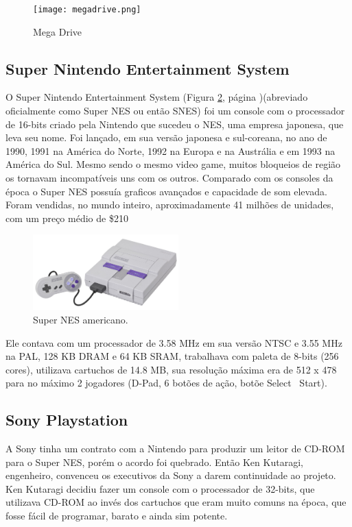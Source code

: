 \documentclass[12pt]{article}
\begin{document}
\begin{figure}[!htb]
    \centering
    \texttt{[image: megadrive.png]}
    \caption{Mega Drive}
    \label{fig:mega}
\end{figure} 



 \subsection{Super Nintendo Entertainment System}
 O Super Nintendo Entertainment System (Figura \ref{fig:snes}, página \pageref{fig:snes})(abreviado oficialmente como Super NES ou ent\~{a}o SNES) foi um console com o processador de 16-bits criado pela Nintendo que sucedeu o NES, uma empresa japonesa, que leva seu nome. Foi lançado, em sua vers\~{a}o japonesa e sul-coreana, no ano de 1990, 1991 na América do Norte, 1992 na Europa e na Austrália e em 1993 na América do Sul. Mesmo sendo o mesmo video game, muitos bloqueios de regi\~{a}o os tornavam incompatíveis uns com os outros. Comparado com os consoles da época o Super NES possuía graficos avançados e capacidade de som elevada. Foram vendidas, no mundo inteiro, aproximadamente 41 milh\~{o}es de unidades, com um preço médio de \$210
\nocite{SNES}
\begin{figure}[!htb]
    \centering
    \includegraphics[width=0.5\textwidth]{SNES.jpg}
    \caption{Super NES americano.}
    \label{fig:snes}
\end{figure} 
Ele contava com um processador de 3.58 MHz em sua vers\~{a}o NTSC e 3.55 MHz na PAL, 128 KB DRAM e 64 KB SRAM, trabalhava com paleta de 8-bits (256 cores), utilizava cartuchos de 14.8 MB, sua resoluç\~{a}o máxima era de 512 x 478 para no máximo 2 jogadores (D-Pad, 6 bot\~{o}es de aç\~{a}o, bot\~{o}e Select \ Start).


\subsection{Sony Playstation}
\nocite{sony}
A Sony tinha um contrato com a Nintendo para produzir um leitor de CD-ROM para o Super NES, porém o acordo foi quebrado. Ent\~{a}o  Ken Kutaragi, engenheiro, convenceu os executivos da Sony a darem continuidade ao projeto. Ken Kutaragi decidiu fazer um console com o processador de 32-bits, que utilizava CD-ROM ao invés dos cartuchos que eram muito comuns na época, que fosse fácil de programar, barato e ainda sim potente.
\end{document}
